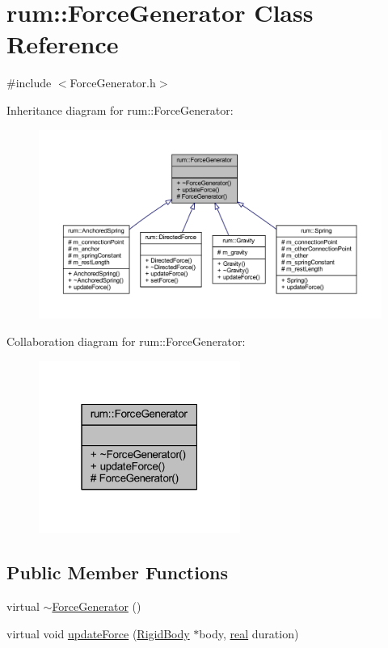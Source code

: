 \hypertarget{classrum_1_1_force_generator}{}\section{rum\+:\+:Force\+Generator Class Reference}
\label{classrum_1_1_force_generator}


{\ttfamily \#include $<$Force\+Generator.\+h$>$}



Inheritance diagram for rum\+:\+:Force\+Generator\+:\nopagebreak
\begin{figure}[H]
\begin{center}
\leavevmode
\includegraphics[width=350pt]{classrum_1_1_force_generator__inherit__graph}
\end{center}
\end{figure}


Collaboration diagram for rum\+:\+:Force\+Generator\+:\nopagebreak
\begin{figure}[H]
\begin{center}
\leavevmode
\includegraphics[width=187pt]{classrum_1_1_force_generator__coll__graph}
\end{center}
\end{figure}
\subsection*{Public Member Functions}
\begin{DoxyCompactItemize}
\item 
virtual \mbox{\hyperlink{classrum_1_1_force_generator_a9b332008be5cec3cdef03fa03077a54e}{$\sim$\+Force\+Generator}} ()
\item 
virtual void \mbox{\hyperlink{classrum_1_1_force_generator_aee5f1dc03ba285b5122fa2a8ba790230}{update\+Force}} (\mbox{\hyperlink{classrum_1_1_rigid_body}{Rigid\+Body}} $\ast$body, \mbox{\hyperlink{namespacerum_a7e8cca23573d5eaead0f138cbaa4862c}{real}} duration)
\end{DoxyCompactItemize}
